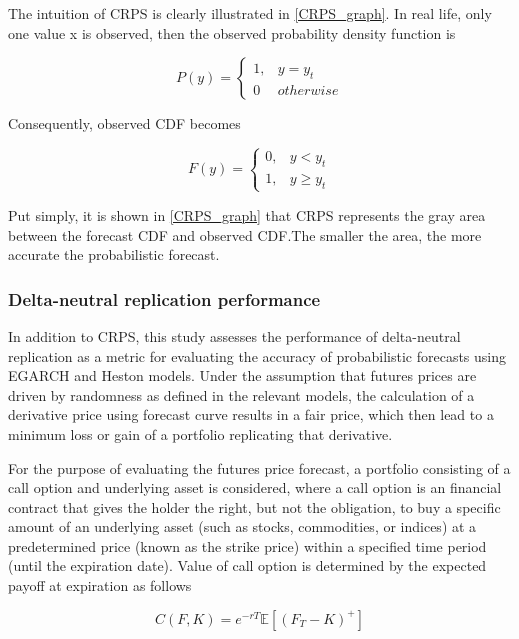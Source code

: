 \documentclass[12pt,a4paper]{article}
\newcommand\colorAutoref[1]{{\hypersetup{linkcolor=black}\autoref{#1}}}
\numberwithin{equation}{section}
\begin{document}
The intuition of CRPS is clearly illustrated in \colorAutoref{CRPS_graph}. In real life, only one value x is observed, then the observed probability density function is 

\begin{equation*}
P(y) = 
\begin{cases}
 1, & y = y_t \\
 0 & otherwise
\end{cases}
\end{equation*}

Consequently, observed CDF becomes

\begin{equation*}
F(y) = 
\begin{cases}
 0, & y < y_t \\
 1, & y \geq y_t
\end{cases}
\end{equation*}
 
Put simply, it is shown in \colorAutoref{CRPS_graph} that CRPS represents the gray area between the forecast CDF and observed CDF.The smaller the area, the more accurate the probabilistic forecast. 

\subsubsection{Delta-neutral replication performance}

In addition to CRPS, this study assesses the performance of delta-neutral replication as a metric for evaluating the accuracy of probabilistic forecasts using EGARCH and Heston models. Under the assumption that futures prices are driven by randomness as defined in the relevant models, the calculation of a derivative price using forecast curve results in a fair price, which then lead to a minimum loss or gain of a portfolio replicating that derivative. 

For the purpose of evaluating the futures price forecast, a portfolio consisting of a call option and underlying asset is considered, where a call option is an financial contract that gives the holder the right, but not the obligation, to buy a specific amount of an underlying asset (such as stocks, commodities, or indices) at a predetermined price (known as the strike price) within a specified time period (until the expiration date). Value of call option is determined by the expected payoff at expiration as follows

\[C(F, K) = e^{-rT} \mathbb{E} \left[(F_T - K)^+ \right] \]
\end{document}
